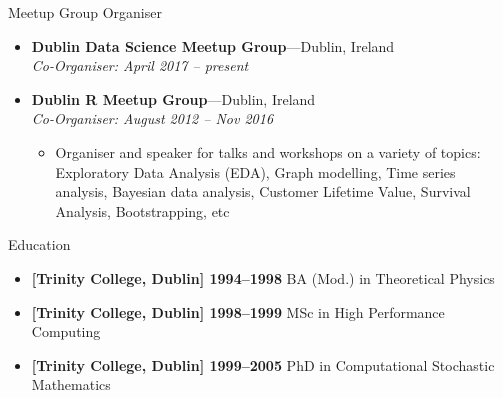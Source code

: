 \documentclass[11pt,a4paper,oneside]{article}
\newenvironment{ressection}[1]{
  \vspace{4pt}
  {\Large#1}
  \begin{itemize}
    \vspace{3pt}
}{
  \end{itemize}
}
\newcommand{\ressubitem}[1]{
  \vspace{-1pt}
  \item \begin{flushleft} #1 \end{flushleft}
}
\newcommand{\resbigitem}[3]{
  \vspace{-5pt}
  \item
  \textbf{#1}---#2 \\
  \textit{#3}
}
\newenvironment{ressubsec}[3]{
  \resbigitem{#1}{#2}{#3}
  \vspace{-2pt}
  \begin{itemize}
}{
  \end{itemize}
}
\begin{document}

\begin{ressection}{Meetup Group Organiser}
  \resbigitem{Dublin Data Science Meetup Group}{Dublin, Ireland}{Co-Organiser: April 2017 -- present}

  \begin{ressubsec}{Dublin R Meetup Group}{Dublin, Ireland}{Co-Organiser: August 2012 -- Nov 2016}
    \ressubitem{Organiser and speaker for talks and workshops on a variety of topics: Exploratory Data Analysis (EDA), Graph modelling, Time series analysis, Bayesian data analysis, Customer Lifetime Value, Survival Analysis, Bootstrapping, etc}
  \end{ressubsec}
\end{ressection}



\begin{ressection}{Education}
  \item \textbf{[Trinity College, Dublin] 1994--1998} BA (Mod.) in Theoretical Physics
  \item \textbf{[Trinity College, Dublin] 1998--1999} MSc in High Performance Computing
  \item \textbf{[Trinity College, Dublin] 1999--2005} PhD in Computational Stochastic Mathematics
\end{ressection}
\end{document}
